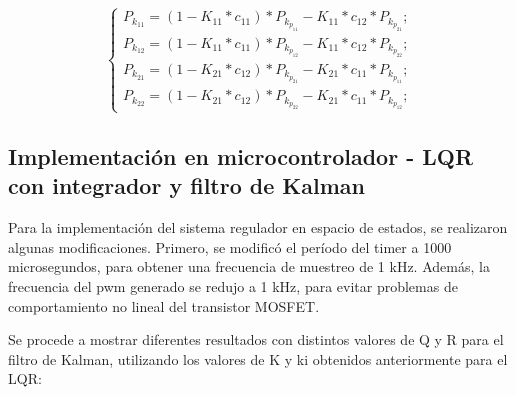 \vspace{-0.5cm}
\begin{equation}
    \begin{cases}
        P_{k_{11}} = (1 - K_{11} * c_{11}) * P_{k_{p_{11}}} - K_{11} * c_{12} * P_{k_{p_{21}}};
        \\
        P_{k_{12}} = (1 - K_{11} * c_{11}) * P_{k_{p_{12}}} - K_{11} * c_{12} * P_{k_{p_{22}}};
        \\
        P_{k_{21}} = (1 - K_{21} * c_{12}) * P_{k_{p_{21}}} - K_{21} * c_{11} * P_{k_{p_{11}}};
        \\
        P_{k_{22}} = (1 - K_{21} * c_{12}) * P_{k_{p_{22}}} - K_{21} * c_{11} * P_{k_{p_{12}}};
    \end{cases}
\end{equation}
\vspace{-0.5cm}

\vspace{-0.5cm}
\subsection{\textbf{Implementación en microcontrolador - LQR con integrador y filtro de Kalman}}
\vspace{-0.5cm}

Para la implementación del sistema regulador en espacio de estados, se realizaron algunas modificaciones.
Primero, se modificó el período del timer a 1000 microsegundos, para obtener una frecuencia de muestreo de 1 kHz.
Además, la frecuencia del pwm generado se redujo a 1 kHz, para evitar problemas de comportamiento no lineal del
transistor MOSFET.

Se procede a mostrar diferentes resultados con distintos valores de Q y R para el filtro de Kalman, utilizando
los valores de K y ki obtenidos anteriormente para el LQR:

